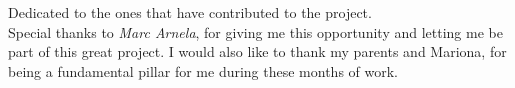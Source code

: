 \thispagestyle{empty}
{}

\vspace*{3cm}

\begin{center}
    Dedicated to the ones that have contributed to the project.
    \medskip
    \\ Special thanks to \textit{Marc Arnela}, for giving me this opportunity and letting me be part of this great project. I would also like to thank my parents and Mariona, for being a fundamental pillar for me during these months of work.
\end{center}

\medskip

